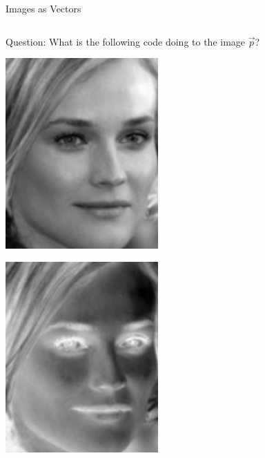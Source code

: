\documentclass[10pt,aspectratio=169,usenames,dvipsnames,handout]{beamer} %
\begin{document}
\begin{frame}[fragile]{Images as Vectors}
\begin{center}
\begin{columns}[T,onlytextwidth]
\begin{block}{Question: What is the following code doing to the image $\vec{p}$?}
\begin{minipage}{0.45\textwidth}
			
		\end{minipage}\hfill
		\pause
		\begin{minipage}{0.2\textwidth}
			\centering\includegraphics[width=0.6\textwidth]{images/vectormatrix/Diane_Kruger}
		\end{minipage}
		\begin{minipage}{0.2\textwidth}
			\centering\includegraphics[width=0.6\textwidth]{images/vectormatrix/Diane_Kruger_negative}
		\end{minipage}
	\end{block}
\end{columns}
\end{center}
\end{frame}
\end{document}

